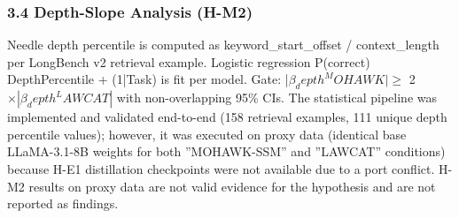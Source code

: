 \subsubsection{3.4 Depth-Slope Analysis (H-M2)}

Needle depth percentile is computed as keyword\_start\_offset / context\_length per LongBench v2 retrieval example. Logistic regression P(correct) ~ DepthPercentile + (1|Task) is fit per model. Gate: |$\beta _depth^MOHAWK| \geq$ 2 $\times |\beta _depth^LAWCAT|$ with non-overlapping 95\% CIs. The statistical pipeline was implemented and validated end-to-end (158 retrieval examples, 111 unique depth percentile values); however, it was executed on proxy data (identical base LLaMA-3.1-8B weights for both ''MOHAWK-SSM'' and ''LAWCAT'' conditions) because H-E1 distillation checkpoints were not available due to a port conflict. H-M2 results on proxy data are not valid evidence for the hypothesis and are not reported as findings.

